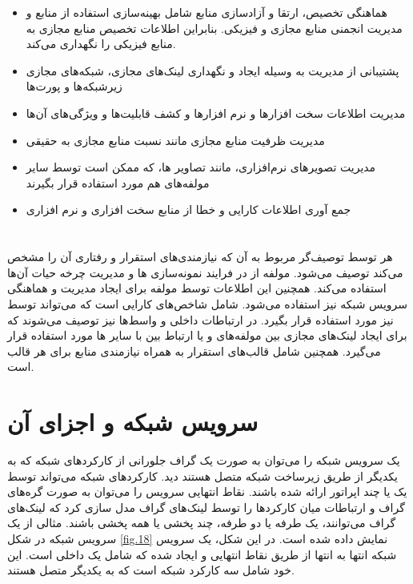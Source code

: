\begin{itemize}
    \item
    هماهنگی تخصیص، ارتقا و آزادسازی منابع  شامل بهینه‌‌سازی استفاده از منابع و مدیریت انجمنی منابع مجازی و فیزیکی.
    بنابراین  اطلاعات  تخصیص منابع مجازی به منابع فیزیکی را نگهداری می‌کند.
    \item
    پشتیبانی از مدیریت  به وسیله ایجاد و نگهداری لینک‌های مجازی،
    شبکه‌های مجازی زیرشبکه‌ها و پورت‌ها
    \item
    مدیریت اطلاعات  سخت افزارها و نرم افزارها و کشف قابلیت‌ها و ویژگی‌های آن‌ها
    \item
    مدیریت ظرفیت منابع مجازی مانند نسبت منابع مجازی به حقیقی
    \item
    مدیریت تصویرهای نرم‌افزاری، مانند تصاویر ها، که ممکن است توسط سایر مولفه‌های  هم مورد استفاده قرار بگیرند
    \item
    جمع آوری اطلاعات کارایی و خطا از منابع سخت افزاری و نرم افزاری
\end{itemize}

\section{}

هر  توسط توصیف‌گر مربوط به آن که نیازمندی‌های استقرار و رفتاری آن را مشخص می‌کند توصیف می‌شود.
مولفه  از  در فرایند نمونه‌سازی ‌ها و مدیریت چرخه حیات آن‌ها استفاده می‌کند.
همچنین این اطلاعات توسط مولفه  برای ایجاد مدیریت و هماهنگی سرویس شبکه نیز استفاده می‌شود.
 شامل شاخص‌های کارایی است که می‌تواند توسط  نیز مورد استفاده قرار بگیرد.
در  ارتباطات داخلی و واسط‌ها نیز توصیف می‌شوند که
برای ایجاد لینک‌های مجازی بین مولفه‌های  و یا ارتباط بین  با سایر ‌ها مورد استفاده قرار می‌گیرد.
 همچنین شامل قالب‌های استقرار  به همراه نیازمندی منابع برای هر قالب است.

\section{سرویس شبکه و اجزای آن}
یک سرویس شبکه را می‌توان به صورت یک گراف جلورانی از کارکردهای شبکه
که به یکدیگر از طریق زیرساخت شبکه متصل هستند دید.
کارکردهای شبکه می‌تواند توسط یک یا چند اپراتور ارائه شده باشند.
نقاط انتهایی سرویس را می‌توان به صورت گره‌های گراف و
ارتباطات میان کارکردها را توسط لینک‌های گراف مدل سازی کرد
که لینک‌های گراف می‌توانند، یک طرفه یا دو طرفه، چند پخشی یا همه پخشی باشند.
مثالی از یک سرویس شبکه در شکل
\ref{fig.18}
نمایش داده شده است.
در این شکل، یک سرویس شبکه انتها به انتها از طریق نقاط انتهایی  و  ایجاد شده که شامل یک  داخلی است.
این  خود شامل سه کارکرد شبکه است که به یکدیگر متصل هستند.



